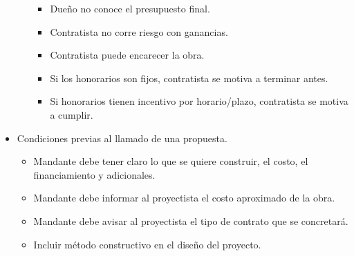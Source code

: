 \documentclass{article} %
\begin{document}
\begin{itemize}[label={},left=0pt,align=parleft]
\begin{itemize}[label={},left=1em,align=parleft]
        \begin{itemize}[label={},left=2em,align=parleft]
            \item \begin{highlightbox}[levelthree] Dueño no conoce el presupuesto final. \end{highlightbox}
            \item \begin{highlightbox}[levelthree] Contratista no corre riesgo con ganancias. \end{highlightbox}
            \item \begin{highlightbox}[levelthree] Contratista puede encarecer la obra. \end{highlightbox}
            \item \begin{highlightbox}[levelthree] Si los honorarios son fijos, contratista se motiva a terminar antes. \end{highlightbox}
            \item \begin{highlightbox}[levelthree] Si honorarios tienen incentivo por horario/plazo, contratista se motiva a cumplir. \end{highlightbox}
        \end{itemize}
    \end{itemize}
    \item \begin{highlightbox}[levelone] Condiciones previas al llamado de una propuesta. \end{highlightbox}
    \begin{itemize}[label={},left=1em,align=parleft]
        \item \begin{highlightbox}[leveltwo] Mandante debe tener claro lo que se quiere construir, el costo, el financiamiento y adicionales. \end{highlightbox}
        \item \begin{highlightbox}[leveltwo] Mandante debe informar al proyectista el costo aproximado de la obra. \end{highlightbox}
        \item \begin{highlightbox}[leveltwo] Mandante debe avisar al proyectista el tipo de contrato que se concretará. \end{highlightbox}
        \item \begin{highlightbox}[leveltwo] Incluir método constructivo en el diseño del proyecto. \end{highlightbox}

\end{itemize}
\end{itemize}
\end{document}

